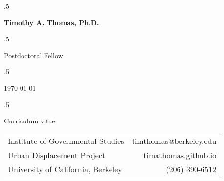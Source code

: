 \documentclass{resume} %
\begin{document}
\moveleft.5\hoffset\centerline{\LARGE\bf Timothy A. Thomas, Ph.D.} %
\vspace{5mm}
\moveleft.5\hoffset\centerline{Postdoctoral Fellow} %
\moveleft.5\hoffset\centerline{\today} %
\moveleft.5\hoffset\centerline{Curriculum vitae} %

\begin{center}
\begin{tabular}{l r}
Institute of Governmental Studies 	& \hspace{2in} timthomas@berkeley.edu \\
Urban Displacement Project	    	& \hspace{2in} timathomas.github.io\\
University of California, Berkeley 	& \hspace{2in} (206) 390-6512
\end{tabular}
\vspace{5mm}
\end{center}

\end{document}
